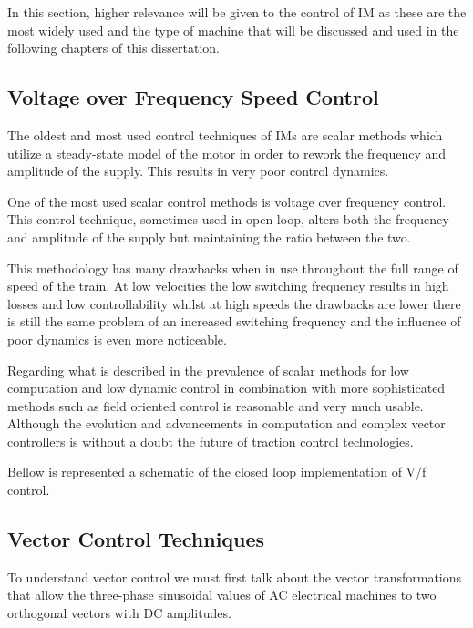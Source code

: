 In this section, higher relevance will be given to the control of IM as these are the most widely used and the type of machine that will be discussed and used in the following chapters of this dissertation.

\subsection{Voltage over Frequency Speed Control}
The oldest and most used control techniques of IMs are scalar methods which utilize a steady-state model of the motor in order to rework the frequency and amplitude of the supply. This results in very poor control dynamics. 

One of the most used scalar control methods is voltage over frequency control. This control technique, sometimes used in open-loop, alters both the frequency and amplitude of the supply but maintaining the ratio between the two.\cite{BibBase}

This methodology has many drawbacks when in use throughout the full range of speed of the train. At low velocities the low switching frequency results in high losses and low controllability whilst at high speeds the drawbacks are lower there is still the same problem of an increased switching frequency and the influence of poor dynamics is even more noticeable.\cite{ScalarSOTA}

Regarding what is described in \cite{ScalarSOTA} the prevalence of scalar methods for low computation and low dynamic control in combination with more sophisticated methods such as field oriented control is reasonable and very much usable. Although the evolution and advancements in computation and complex vector controllers is without a doubt the future of traction control technologies.

Bellow is represented a schematic of the closed loop implementation of V/f control.

\subsection{Vector Control Techniques}
To understand vector control we must first talk about the vector transformations that allow the three-phase sinusoidal values of AC electrical machines to two orthogonal vectors with DC amplitudes.

